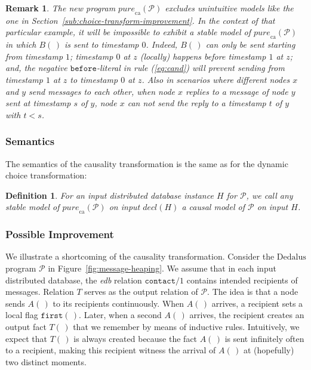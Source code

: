 \documentclass{tlp}
\newtheorem{definition}{Definition}[section]
\newtheorem{remark}{Remark}
\newcommand{\langname}[1]{\text{#1}}  \newcommand{\pred}[1]{\mathtt{#1}}  \newcommand{\fname}[1]{\mathit{#1}}  \newcommand{\sq}[1]{`{#1}'}
\newcommand{\dedalus}{\langname{Dedalus}}
\newcommand{\ded}{\mathcal{P}}
\newcommand{\rar}[2]{#1/#2}
\newcommand{\ntup}{(\,)}
\newcommand{\before}{\pred{before}}
\newcommand{\decl}[1]{\fname{decl}(#1)}
\newcommand{\purecaus}[1]{\fname{pure}_{\mathrm{ca}}(#1)}
\begin{document}
\begin{remark}The new program $\purecaus{\ded}$ excludes unintuitive
models like the one in Section~\ref{sub:choice-transform-improvement}.
In the context of that particular example, it will be impossible to
exhibit a stable model of $\purecaus{\ded}$ in which $B\ntup$ is
sent to timestamp $0$. Indeed, $B\ntup$ can only be sent starting
from timestamp $1$; timestamp $0$ at $z$ (locally) happens before
timestamp $1$ at $z$; and, the negative $\before$-literal in rule
(\ref{eq:cand}) will prevent sending from timestamp $1$ at $z$
to timestamp $0$ at $z$. Also in scenarios where different nodes
$x$ and $y$ send messages to each other, when node $x$ replies
to a message of node $y$ sent at timestamp $s$ of $y$, node $x$
can not send the reply to a timestamp $t$ of $y$ with $t<s$.\end{remark}


\subsubsection{Semantics}

The semantics of the causality transformation is the same as for the
dynamic choice transformation:

\begin{definition}For an input distributed database instance $H$
for $\ded$, we call any stable model of $\purecaus{\ded}$ on input
$\decl H$ a \emph{causal model} of $\ded$ on input $H$.\end{definition}


\subsubsection{Possible Improvement}

\newcommand{\lbefore}{\mathrm{before}}


We illustrate a shortcoming of the causality transformation. Consider
the $\dedalus$ program $\ded$ in Figure~\ref{fig:message-heaping}.
We assume that in each input distributed database, the \emph{edb}
relation $\rar{\pred{contact}}1$ contains intended recipients of
messages. Relation $T$ serves as the output relation of $\ded$.
The idea is that a node sends $A\ntup$ to its recipients continuously.
When $A\ntup$ arrives, a recipient sets a local flag $\pred{first}\ntup$.
Later, when a second $A\ntup$ arrives, the recipient creates an output
fact $T\ntup$ that we remember by means of inductive rules. Intuitively,
we expect that $T\ntup$ is always created because the fact $A\ntup$
is sent infinitely often to a recipient, making this recipient witness
the arrival of $A\ntup$ at (hopefully) two distinct moments.
\end{document}

